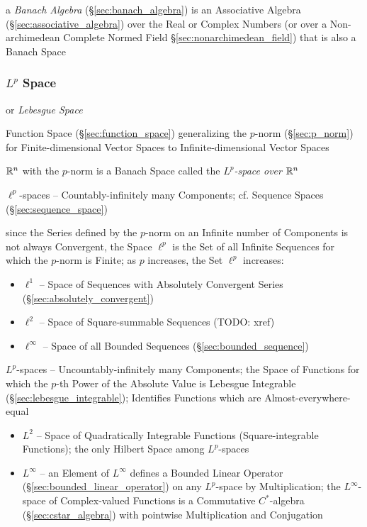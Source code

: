 a \emph{Banach Algebra} (\S\ref{sec:banach_algebra}) is an Associative Algebra
(\S\ref{sec:associative_algebra}) over the Real or Complex Numbers (or over a
Non-archimedean Complete Normed Field \S\ref{sec:nonarchimedean_field}) that is
also a Banach Space



\subsubsection{$L^p$ Space}\label{sec:lp_space}

or \emph{Lebesgue Space}

Function Space (\S\ref{sec:function_space}) generalizing the $p$-norm
(\S\ref{sec:p_norm}) for Finite-dimensional Vector Spaces to
Infinite-dimensional Vector Spaces

$\mathbb{R}^n$ with the $p$-norm is a Banach Space called the
\emph{$L^p$-space over $\mathbb{R}^n$}

$\ell^p$-spaces -- Countably-infinitely many Components; cf. Sequence Spaces
(\S\ref{sec:sequence_space})

since the Series defined by the $p$-norm on an Infinite number of Components is
not always Convergent, the Space $\ell^p$ is the Set of all Infinite Sequences
for which the $p$-norm is Finite; as $p$ increases, the Set $\ell^p$ increases:
\begin{itemize}
  \item $\ell^1$ -- Space of Sequences with Absolutely Convergent Series
    (\S\ref{sec:absolutely_convergent})
  \item $\ell^2$ -- Space of Square-summable Sequences (TODO: xref)
  \item $\ell^\infty$ -- Space of all Bounded Sequences
    (\S\ref{sec:bounded_sequence})
\end{itemize}

$L^p$-spaces -- Uncountably-infinitely many Components; the Space of Functions
for which the $p$-th Power of the Absolute Value is Lebesgue Integrable
(\S\ref{sec:lebesgue_integrable}); Identifies Functions which are
Almost-everywhere-equal

\begin{itemize}
  \item $L^2$ -- Space of Quadratically Integrable Functions (Square-integrable
    Functions); the only Hilbert Space among $L^p$-spaces
  \item $L^\infty$ -- an Element of $L^\infty$ defines a Bounded Linear Operator
    (\S\ref{sec:bounded_linear_operator}) on any $L^p$-space by Multiplication;
    the $L^\infty$-space of Complex-valued Functions is a Commutative
    $C^*$-algebra (\S\ref{sec:cstar_algebra}) with pointwise Multiplication and
    Conjugation
\end{itemize}


